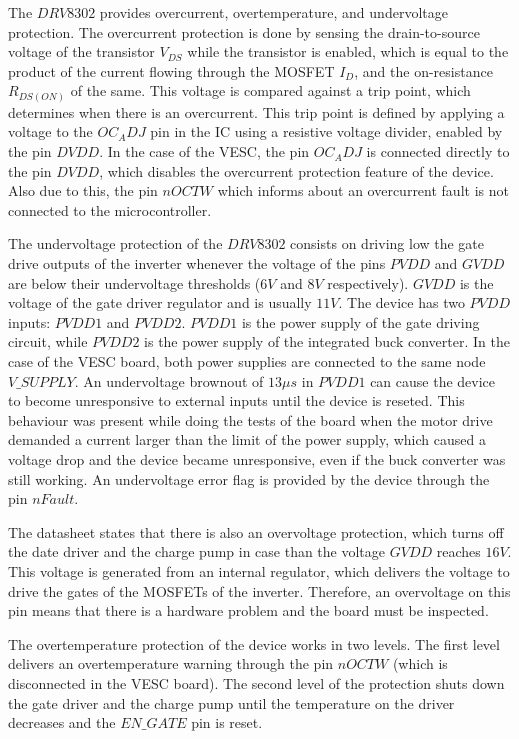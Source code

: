 The $DRV8302$ provides overcurrent, overtemperature, and undervoltage protection. The overcurrent protection is done by sensing the drain-to-source voltage of the transistor $V_{DS}$ while the transistor is enabled, which is equal to the product of the current flowing through the \ac{MOSFET} $I_{D}$, and the on-resistance $R_{DS(ON)}$ of the same. This voltage is compared against a trip point, which determines when there is an overcurrent. This trip point is defined by applying a voltage to the $OC_ADJ$ pin in the \ac{IC} using a resistive voltage divider, enabled by the pin $DVDD$. In the case of the VESC, the pin $OC_ADJ$ is connected directly to the pin $DVDD$, which disables the overcurrent protection feature of the device. Also due to this, the pin $nOCTW$ which informs about an overcurrent fault is not connected to the microcontroller.

The undervoltage protection of the $DRV8302$ consists on driving low the gate drive outputs of the inverter whenever the voltage of the pins $PVDD$ and $GVDD$ are below their undervoltage thresholds ($6V$ and $8V$ respectively). $GVDD$ is the voltage of the gate driver regulator and is usually $11V$. The device has two $PVDD$ inputs: $PVDD1$ and $PVDD2$. $PVDD1$ is the power supply of the gate driving circuit, while $PVDD2$ is the power supply of the integrated buck converter. In the case of the VESC board, both power supplies are connected to the same node $V\_SUPPLY$. An undervoltage brownout of $13\mu s$ in $PVDD1$ can cause the device to become unresponsive to external inputs until the device is reseted. This behaviour was present while doing the tests of the board when the motor drive demanded a current larger than the limit of the power supply, which caused a voltage drop and the device became unresponsive, even if the buck converter was still working. An undervoltage error flag is provided by the device through the pin $nFault$.

The datasheet states that there is also an overvoltage protection, which turns off the date driver and the charge pump in case than the voltage $GVDD$ reaches $16V$. This voltage is generated from an internal regulator, which delivers the voltage to drive the gates of the \ac{MOSFET}s of the inverter. Therefore, an overvoltage on this pin means that there is a hardware problem and the board must be inspected.

The overtemperature protection of the device works in two levels. The first level delivers an overtemperature warning through the pin $nOCTW$ (which is disconnected in the VESC board). The second level of the protection shuts down the gate driver and the charge pump until the temperature on the driver decreases and the $EN\_GATE$ pin is reset. 

